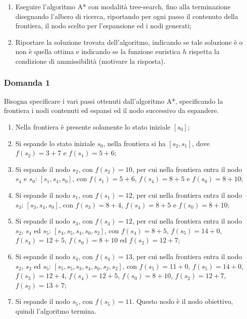 \documentclass{article}
\numberwithin{equation}{section}
\begin{document}
\begin{enumerate}
    \item Eseguire l'algoritmo A* con modalità tree-search, fino alla terminazione disegnando l'albero di ricerca, riportando per ogni passo il 
contenuto della frontiera, il nodo scelto per l'espansione ed i nodi generati;
    \item Riportare la soluzione trovata dell'algoritmo, indicando se tale soluzione è o non è quella ottima e indicando se la funzione euristica 
$h$ rispetta la condizione di ammissibilità (motivare la risposta). 
\end{enumerate}

\subsubsection*{Domanda 1}

Bisogna specificare i vari passi ottenuti dall'algoritmo A*, specificando la frontiera i nodi contenuti ed espansi ed il nodo successivo 
da espandere.

\begin{enumerate}
    \item Nella frontiera è presente solamente lo stato iniziale $[s_0]$;
    \item Si espande lo stato iniziale $s_0$, nella frontiera si ha $[s_2,s_1]$, dove $f(s_2)=3+7$ e $f(s_1)=5+6$;
    \item Si espande il nodo $s_2$, con $f(s_2)=10$, per cui nella frontiera entra il nodo $s_4$ e $s_0$: $[s_1,s_4, s_0]$, con $f(s_1)=5+6$, $f(s_4)=8+5$ e $f(s_0)=8+10$;
    \item Si espande il nodo $s_1$, con $f(s_1)=12$, per cui nella frontiera entra il nodo $s_3$: $[s_3, s_4, s_0]$, con $f(s_3)=8+4$, $f(s_4)=8+5$ e $f(s_0)=8+10$;
    \item Si espande il nodo $s_3$, con $f(s_3)=12$, per cui nella frontiera entra il nodo $s_2$, $s_4$ ed $s_5$: $[s_4, s_5, s_4, s_0, s_2]$, con $f(s_4)=8+5$, $f(s_5)=14+0$, $f(s_4)=12+5$, $f(s_0)=8+10$ ed $f(s_2)=12+7$;
    \item Si espande il nodo $s_4$, con $f(s_4)=13$, per cui nella frontiera entra il nodo $s_2$, $s_3$ ed $s_5$: $[s_5, s_5, s_3, s_4, s_0, s_2, s_2]$, con $f(s_5)=11+0$, $f(s_5)=14+0$, $f(s_3)=12+4$, $f(s_4)=12+5$, $f(s_0)=8+10$, $f(s_2)=12+7$, $f(s_2)=13+7$;
    \item Si espande il nodo $s_5$, con $f(s_5)=11$. Questo nodo è il nodo obiettivo, quindi l'algoritmo termina. 
\end{enumerate}
\end{document}
